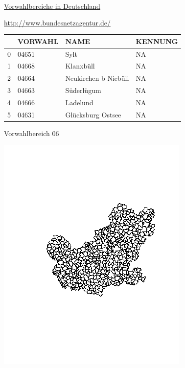 \documentclass[ignorenonframetext,]{beamer}
\begin{document}
\begin{frame}{\href{http://www.bundesnetzagentur.de/SharedDocs/Downloads/DE/Sachgebiete/Telekommunikation/Unternehmen_Institutionen/Nummerierung/Rufnummern/ONVerzeichnisse/ONBGrenzen/ONB_Grenzen.html}{Vorwahlbereiche
in Deutschland}}
\protect\hypertarget{vorwahlbereiche-in-deutschland}{}

\url{http://www.bundesnetzagentur.de/}

\begin{longtable}[]{@{}llll@{}}
\toprule
& VORWAHL & NAME & KENNUNG\tabularnewline
\midrule
\endhead
0 & 04651 & Sylt & NA\tabularnewline
1 & 04668 & Klanxbüll & NA\tabularnewline
2 & 04664 & Neukirchen b Niebüll & NA\tabularnewline
3 & 04663 & Süderlügum & NA\tabularnewline
4 & 04666 & Ladelund & NA\tabularnewline
5 & 04631 & Glücksburg Ostsee & NA\tabularnewline
\bottomrule
\end{longtable}

\end{frame}

\begin{frame}{Vorwahlbereich 06}
\protect\hypertarget{vorwahlbereich-06}{}

\includegraphics{figure/Vorwahl06.png}

\end{frame}
\end{document}
